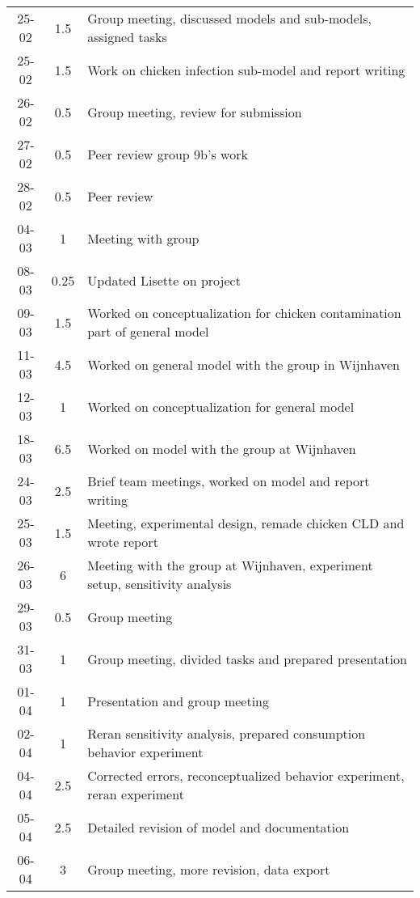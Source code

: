 \begin{longtable}[c]{c|c|m{35em}}
25-02   &   1.5     &   Group meeting, discussed models and sub-models, assigned tasks              \\
25-02   &   1.5     &   Work on chicken infection sub-model and report writing                      \\
26-02   &   0.5     &   Group meeting, review for submission                                        \\
27-02   &   0.5     &   Peer review group 9b's work                                                 \\
28-02   &   0.5     &   Peer review                                                                 \\
04-03   &   1       &   Meeting with group                                                          \\
08-03   &   0.25    &   Updated Lisette on project                                                  \\
09-03   &   1.5     &   Worked on conceptualization for chicken contamination part of general model \\
11-03   &   4.5     &   Worked on general model with the group in Wijnhaven                         \\
12-03   &   1       &   Worked on conceptualization for general model                               \\
18-03   &   6.5     &   Worked on model with the group at Wijnhaven                                 \\
24-03   &   2.5     &   Brief team meetings, worked on model and report writing                     \\
25-03   &   1.5     &   Meeting, experimental design, remade chicken CLD and wrote report           \\
26-03   &   6       &   Meeting with the group at Wijnhaven, experiment setup, sensitivity analysis \\
29-03   &   0.5     &   Group meeting                                                               \\
31-03   &   1       &   Group meeting, divided tasks and prepared presentation                      \\
01-04   &   1       &   Presentation and group meeting                                              \\
02-04   &   1       &   Reran sensitivity analysis, prepared consumption behavior experiment        \\
04-04   &   2.5     &   Corrected errors, reconceptualized behavior experiment, reran experiment    \\
05-04   &   2.5     &   Detailed revision of model and documentation                                \\
06-04   &   3       &   Group meeting, more revision, data export                                   \\



\end{longtable}

